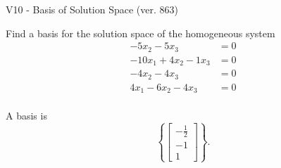 \begin{exercise}
  \begin{exerciseTitle}V10 - Basis of Solution Space (ver. 863)\end{exerciseTitle}
  \begin{exerciseStatement}
    Find a basis for the solution space of the homogeneous system 
\begin{align*}
 -5 x_ 2 -5 x_ 3 &= 0  \\ 
  -10 x_ 1 + 4 x_ 2 -1 x_ 3 &= 0  \\ 
  -4 x_ 2 -4 x_ 3 &= 0  \\ 
  4 x_ 1 -6 x_ 2 -4 x_ 3 &= 0  \\ 
 \end{align*}


 
  \end{exerciseStatement}

  \begin{exerciseAnswer}
   A basis is   
\[\left\{\left[\begin{array}{c}
-\frac{1}{2} \\
-1 \\
1
\end{array}\right]\right\}.\]

  


  \end{exerciseAnswer}
\end{exercise}